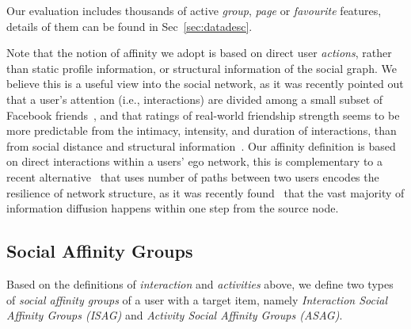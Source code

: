 Our evaluation includes thousands of active {\em group}, {\em page} or {\em favourite} features, details of them can be found in Sec~\ref{sec:datadesc}.

Note that the notion of affinity we adopt is based on direct user {\em actions}, rather than
static profile information, or structural information of the social graph. 
We believe this is a useful view into the social network, as it was recently pointed out
that a user's attention (i.e., interactions) are divided among a small subset of Facebook friends~\cite{backstrom2011center}, and that ratings of real-world friendship strength seems to be more predictable from the intimacy, intensity, and duration of interactions, than from social distance and structural information~\cite{gilbert2009predicting}. Our affinity definition is based on direct interactions within a users' ego network, this is complementary to 
a recent alternative~\cite{Panigrahy2012ubr} that uses number of paths between two users encodes the resilience of network structure, 
as it was recently found~\cite{Goel2012structure} that the vast majority of information diffusion
happens within one step from the source node. 


\subsection{Social Affinity Groups}


Based on the definitions of {\em interaction}  and {\em activities} above, 
we define two types of {\em social affinity groups} of a user with a target item,
namely \textit{Interaction  Social Affinity Groups (ISAG)} and \textit{Activity Social Affinity Groups (ASAG)}.

